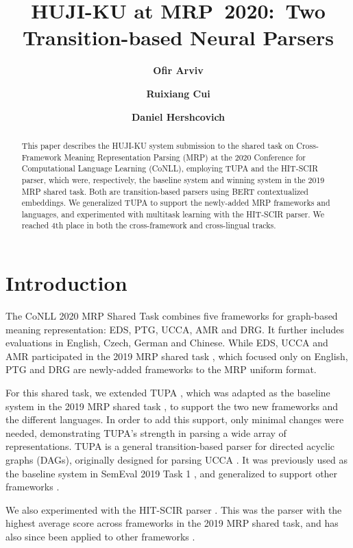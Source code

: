 \documentclass[11pt,a4paper]{article}
\title{HUJI-KU at MRP~2020:\ Two Transition-based Neural Parsers}
\author[*]{\textbf{Ofir Arviv}}
\affil[*]{Hebrew University of Jerusalem, School of Computer Science and Engineering}
\author[**]{\textbf{Ruixiang Cui}}
\author[**]{\textbf{Daniel Hershcovich}}
\affil[**]{University of Copenhagen, Department of Computer Science}
\affil[ ]{\texttt{ofir.arviv@mail.huji.ac.il},\quad\texttt{\{rc,dh\}@di.ku.dk}}
\date{}
\begin{document}
\maketitle
\begin{abstract}
  This paper describes the HUJI-KU system submission to the shared task
  on Cross-Framework Meaning Representation Parsing (MRP) at the 2020
  Conference for Computational Language Learning (CoNLL),
  employing TUPA and the HIT-SCIR parser, which were, respectively,
  the baseline system and winning system in the 2019 MRP shared task.
  Both are transition-based parsers using BERT contextualized embeddings.
  We generalized TUPA to support the newly-added MRP frameworks and languages,
  and experimented with multitask learning with the HIT-SCIR parser.
  We reached 4th place in both the cross-framework and cross-lingual tracks.
\end{abstract}

\section{Introduction}\label{sec:intro}

The CoNLL 2020 MRP Shared Task \cite{Oep:Abe:Abz:20}
combines five frameworks for graph-based meaning representation:
EDS, PTG, UCCA, AMR and DRG.
It further includes evaluations in English, Czech, German and Chinese.
While EDS, UCCA and AMR participated in the 2019 MRP shared task
\cite{Oep:Abe:Haj:19}, which focused only on English,
PTG and DRG are newly-added frameworks to the MRP uniform format.

For this shared task, we extended TUPA \cite{hershcovich2017a},
which was adapted as the baseline system in the 2019 MRP shared task
\cite{hershcovich-arviv-2019-tupa},
to support the two new frameworks and the different languages. In order to add this support, only minimal changes were needed, demonstrating TUPA's strength in parsing a wide array of representations. 
TUPA is a general transition-based parser
for directed acyclic graphs (DAGs),
originally designed for parsing UCCA
\cite{abend2013universal}.
It was previously used as the baseline system in
SemEval 2019 Task 1 \cite{hershcovich2019semeval},
and generalized to support other frameworks \cite{Her:Abe:Rap:18,hershcovich2018universal}.

We also experimented with the HIT-SCIR parser
\cite{che-etal-2019-hit}.
This was the parser with the highest average score across
frameworks in the 2019 MRP shared task, and has also since
been applied to other frameworks 
\cite{hershcovich-etal-2020-kopsala}.
\end{document}
